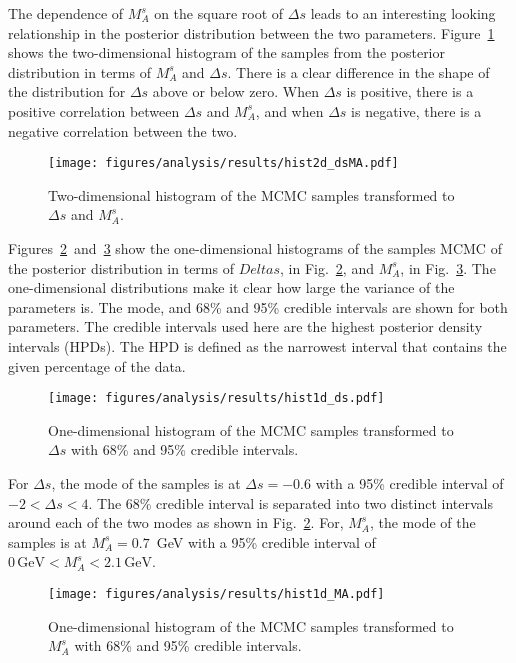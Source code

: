     The dependence of $M_A^s$ on the square root of $\Delta s$ leads to an
    interesting looking relationship in the posterior distribution between the
    two parameters. Figure~\ref{fig:hist2dmads} shows the two-dimensional
    histogram of the samples from the posterior distribution in terms of
    $M_A^s$ and $\Delta s$. There is a clear difference in the shape of the
    distribution for $\Delta s$ above or below zero. When $\Delta s$ is
    positive, there is a positive correlation between $\Delta s$ and $M_A^s$,
    and when $\Delta s$ is negative, there is a negative correlation between
    the two.  \begin{figure}[h] \centering
    \texttt{[image: figures/analysis/results/hist2d\_dsMA.pdf]}
    \caption{Two-dimensional histogram of the MCMC samples transformed to
    $\Delta s$ and $M_A^s$.} \label{fig:hist2dmads} \end{figure}

    Figures~\ref{fig:hist1dds}~and~\ref{fig:hist1dma} show the one-dimensional
    histograms of the samples MCMC of the posterior distribution in terms of
    $Delta s$, in Fig.~\ref{fig:hist1dds}, and $M_A^s$, in
    Fig.~\ref{fig:hist1dma}. The one-dimensional distributions make it clear
    how large the variance of the parameters is. The mode, and 68\% and 95\%
    credible intervals are shown for both parameters. The credible intervals
    used here are the highest posterior density intervals (HPDs). The HPD is
    defined as the narrowest interval that contains the given percentage of the
    data.  \begin{figure}[h] \centering
    \texttt{[image: figures/analysis/results/hist1d\_ds.pdf]}
    \caption{One-dimensional histogram of the MCMC samples transformed to
    $\Delta s$ with 68\% and 95\% credible intervals.} \label{fig:hist1dds}
    \end{figure}

    For $\Delta s$, the mode of the samples is at $\Delta s = -0.6$ with a 95\%
    credible interval of $-2 < \Delta s < 4$. The 68\% credible interval is
    separated into two distinct intervals around each of the two modes as shown
    in Fig.~\ref{fig:hist1dds}. For, $M_A^s$, the mode of the samples is at
    $M_A^s = 0.7$~GeV with a 95\% credible interval of $0\, \textrm{GeV} <
    M_A^s < 2.1\, \textrm{GeV}$.
    \begin{figure}[h]
      \centering
      \texttt{[image: figures/analysis/results/hist1d\_MA.pdf]} 
      \caption{One-dimensional histogram of the MCMC samples transformed to
      $M_A^s$ with 68\% and 95\% credible intervals.}
      \label{fig:hist1dma}
    \end{figure}
    
